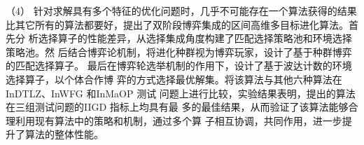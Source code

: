 \begin{cabstract}
（4） 针对求解具有多个特征的优化问题时，几乎不可能存在一个算法获得的结果
比其它所有的算法都要好，提出了双阶段博弈集成的区间高维多目标进化算法。首先分
析选择算子的性能差异，从选择集成角度构建了匹配选择策略池和环境选择策略池。然
后结合博弈论机制，将进化种群视为博弈玩家，设计了基于种群博弈的匹配选择算子。
最后在博弈轮选举机制的作用下，设计了基于波达计数的环境选择算子，以个体合作博
弈的方式选择最优解集。将该算法与其他六种算法在InDTLZ、InWFG 和InMaOP 测试
问题上进行比较，实验结果表明，提出的算法在三组测试问题的IIGD 指标上均具有最
多的最佳结果，从而验证了该算法能够合理利用现有算法中的策略和机制，通过多个算
子相互协调，共同作用，进一步提升了算法的整体性能。

\end{cabstract}

\begin{eabstract}
%
\lipsum[1-5]
\end{eabstract}

